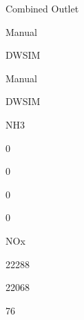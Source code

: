 \documentclass[a4paper,portrait,12pt]{article}
\begin{document}
\begin{flushleft}
Combined Outlet
\end{flushleft}





\begin{flushleft}
Manual
\end{flushleft}





\begin{flushleft}
DWSIM
\end{flushleft}





\begin{flushleft}
Manual
\end{flushleft}





\begin{flushleft}
DWSIM
\end{flushleft}





\begin{flushleft}
NH3
\end{flushleft}





0





0





0





0





\begin{flushleft}
NOx
\end{flushleft}





22288





22068





76
\end{document}
